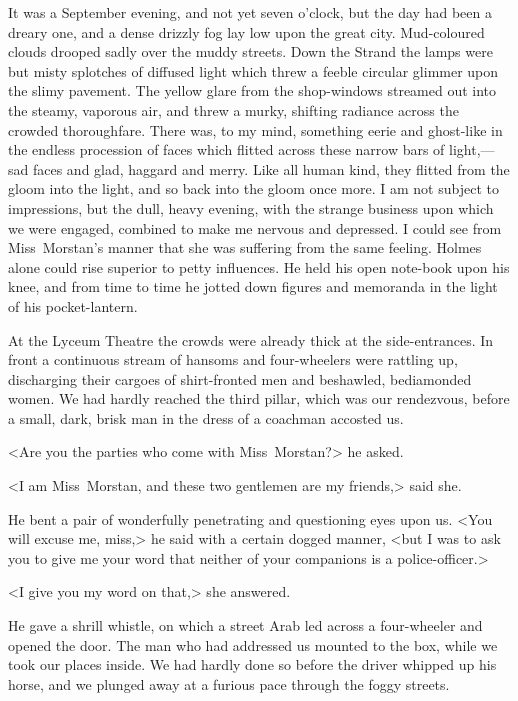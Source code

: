 It was a September evening, and not yet seven o'clock, but the day had been a dreary one, and a dense drizzly fog lay low upon the great city. Mud-coloured clouds drooped sadly over the muddy streets. Down the Strand the lamps were but misty splotches of diffused light which threw a feeble circular glimmer upon the slimy pavement. The yellow glare from the shop-windows streamed out into the steamy, vaporous air, and threw a murky, shifting radiance across the crowded thoroughfare. There was, to my mind, something eerie and ghost-like in the endless procession of faces which flitted across these narrow bars of light,—sad faces and glad, haggard and merry. Like all human kind, they flitted from the gloom into the light, and so back into the gloom once more. I am not subject to impressions, but the dull, heavy evening, with the strange business upon which we were engaged, combined to make me nervous and depressed. I could see from Miss~Morstan's manner that she was suffering from the same feeling. Holmes alone could rise superior to petty influences. He held his open note-book upon his knee, and from time to time he jotted down figures and memoranda in the light of his pocket-lantern.

At the Lyceum Theatre the crowds were already thick at the side-entrances. In front a continuous stream of hansoms and four-wheelers were rattling up, discharging their cargoes of shirt-fronted men and beshawled, bediamonded women. We had hardly reached the third pillar, which was our rendezvous, before a small, dark, brisk man in the dress of a coachman accosted us.

<Are you the parties who come with Miss~Morstan?> he asked.

<I am Miss~Morstan, and these two gentlemen are my friends,> said she.

He bent a pair of wonderfully penetrating and questioning eyes upon us. <You will excuse me, miss,> he said with a certain dogged manner, <but I was to ask you to give me your word that neither of your companions is a police-officer.>

<I give you my word on that,> she answered.

He gave a shrill whistle, on which a street Arab led across a four-wheeler and opened the door. The man who had addressed us mounted to the box, while we took our places inside. We had hardly done so before the driver whipped up his horse, and we plunged away at a furious pace through the foggy streets.

